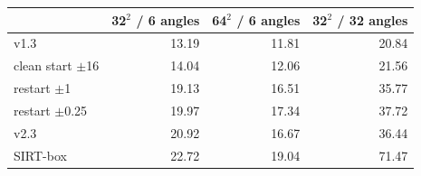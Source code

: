 \begin{tabular}{lrrr}
\toprule
 & 32$^2$ / 6 angles & 64$^2$ / 6 angles & 32$^2$ / 32 angles \\
\midrule
v1.3 & 13.19 & 11.81 & 20.84 \\
clean start $\pm$16 & 14.04 & 12.06 & 21.56 \\
restart $\pm$1 & 19.13 & 16.51 & 35.77 \\
restart $\pm$0.25 & 19.97 & 17.34 & 37.72 \\
v2.3 & 20.92 & 16.67 & 36.44 \\
SIRT-box & 22.72 & 19.04 & 71.47 \\
\bottomrule
\end{tabular}
